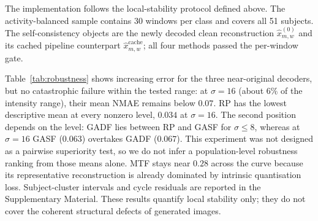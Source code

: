 \documentclass[5p]{elsarticle}
\begin{document}
The implementation follows the local-stability protocol defined above. The activity-balanced sample contains 30 windows per class and covers all 51 subjects. The self-consistency objects are the newly decoded clean reconstruction \(\hat x^{(0)}_{m,w}\) and its cached pipeline counterpart \(\hat x^{\mathrm{cache}}_{m,w}\); all four methods passed the per-window gate.

Table~\ref{tab:robustness} shows increasing error for the three near-original decoders, but no catastrophic failure within the tested range: at \(\sigma=16\) (about \(6\%\) of the intensity range), their mean NMAE remains below \(0.07\). RP has the lowest descriptive mean at every nonzero level, \(0.034\) at \(\sigma=16\). The second position depends on the level: GADF lies between RP and GASF for \(\sigma\le8\), whereas at \(\sigma=16\) GASF (\(0.063\)) overtakes GADF (\(0.067\)). This experiment was not designed as a pairwise superiority test, so we do not infer a population-level robustness ranking from those means alone. MTF stays near \(0.28\) across the curve because its representative reconstruction is already dominated by intrinsic quantisation loss. Subject-cluster intervals and cycle residuals are reported in the Supplementary Material. These results quantify local stability only; they do not cover the coherent structural defects of generated images.

\begin{table}[!htbp]
\centering
\caption{Controlled local-stability test: NMAE under zero-mean Gaussian pixel noise (standard deviation \(\sigma\), out of 255). Values are mean$\pm$standard deviation across 150 activity-balanced, subject-spread windows after averaging two independent draws per nonzero level. Subject-cluster 95\% intervals are in the Supplementary Material.}\label{tab:robustness}
\end{table}
\end{document}
